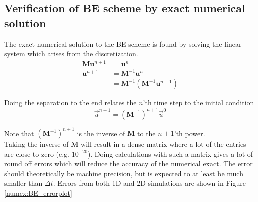 \subsection{Verification of BE scheme by exact numerical solution}

The exact numerical solution to the BE scheme is found by solving the linear system which arises from the discretization. 
\begin{align*}
 \mathbf M \mathbf u^{n+1} &= \mathbf{u}^n \\
 \mathbf{u}^{n+1} &= \mathbf{M}^{-1} \mathbf{u}^n \\
 &= \mathbf{M}^{-1}\left(\mathbf{M}^{-1} \mathbf{u}^{n-1}\right)
\end{align*}

Doing the separation to the end relates the $n$'th time step to the initial condition
\begin{equation}\label{BE_numex}
 \vec u^{n+1} = \left(\mathbf M^{-1}\right)^{n+1} \vec u^0
\end{equation}

Note that $\left(\mathbf M^{-1}\right)^{n+1}$ is the inverse of $\mathbf M$ to the $n+1$'th power.\\

Taking the inverse of $\mathbf M$ will result in a dense matrix where a lot of the entries are close to zero (e.g. $10^{-20}$). 
Doing calculations with such a matrix gives a lot of round off errors which will reduce the accuracy of the numerical exact. 
The error should theoretically be machine precision, but is expected to at least be much smaller than $\Delta t$. 
Errors from both 1D and 2D simulations are shown in Figure \ref{numex:BE_errorplot}

